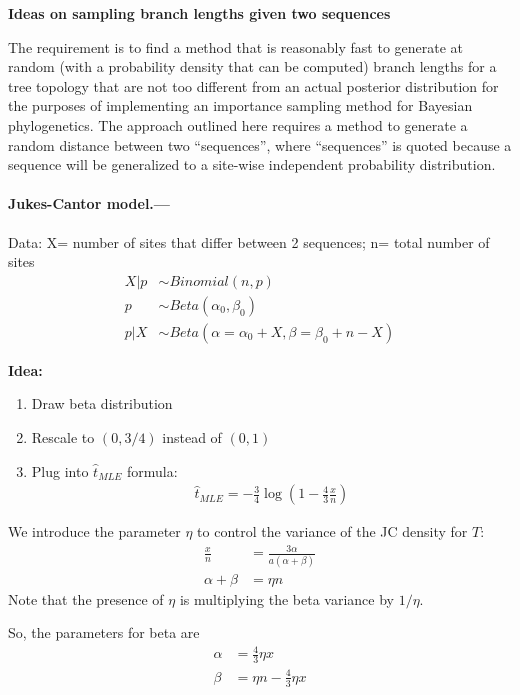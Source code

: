 \documentclass[12pt,letterpaper]{article}
\begin{document}
\begin{center}
\textbf{Ideas on sampling branch lengths given two sequences}
\end{center}

The requirement is to find a method that is reasonably fast
to generate at random (with a probability density that can be computed)
branch lengths for a tree topology that are not too different from an actual posterior distribution
for the purposes of implementing an importance sampling method for Bayesian phylogenetics.
The approach outlined here requires a method to generate a random distance between two ``sequences'',
where ``sequences'' is quoted because a sequence will be generalized to a site-wise independent probability distribution.

\paragraph{Jukes-Cantor model.---}
Data: X= number of sites that differ between 2 sequences; n= total
number of sites
\begin{align*}
X|p &\sim Binomial(n,p)\\
p &\sim Beta(\alpha_0,\beta_0)\\
p|X &\sim Beta(\alpha=\alpha_0+X,\beta=\beta_0+n-X)
\end{align*}

\textbf{Idea:}
\begin{enumerate}
\item Draw beta distribution
\item Rescale to $(0,3/4)$ instead of $(0,1)$
\item Plug into $\hat{t}_{MLE}$ formula:
\begin{align*}
\hat{t}_{MLE}=-\frac{3}{4} \log \left( 1- \frac{4}{3} \frac{x}{n} \right)
\end{align*}
\end{enumerate}

We introduce the parameter $\eta$ to control the variance of the JC
density for $T$:
\begin{align*}
\frac{x}{n}&=\frac{3\alpha}{a(\alpha+\beta)}\\
\alpha+\beta &= \eta n
\end{align*}
Note that the presence of $\eta$ is multiplying the beta variance by $1/ \eta$.

So, the parameters for beta are
\begin{align*}
\alpha&=\frac{4}{3}\eta x \\
\beta&=\eta n - \frac{4}{3} \eta x
\end{align*}
\end{document}
